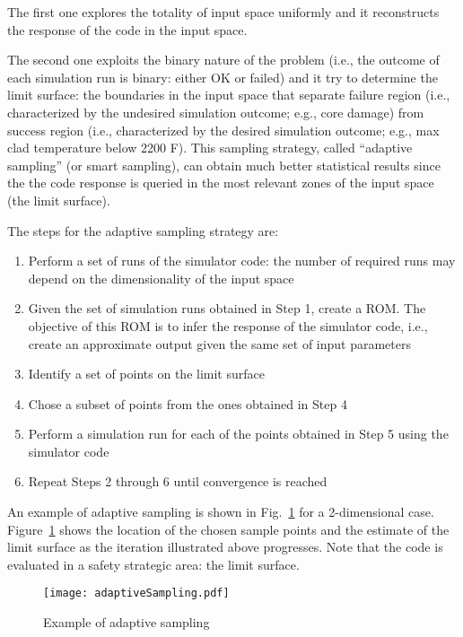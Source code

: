 The first one explores the totality of input space uniformly and it reconstructs the response of the code in 
the input space. 

The second one exploits the binary nature of the problem (i.e., the outcome of each simulation run is binary:
either OK or failed) and it try to determine the limit surface: the boundaries in the input space that separate 
failure region (i.e.,
characterized by the undesired simulation outcome; e.g., core damage) from success region (i.e., characterized 
by the desired simulation outcome; e.g., max clad temperature below 2200 F). 
This sampling strategy, called ``adaptive sampling'' (or smart sampling), can obtain much better statistical results
since the the code response is queried in the most relevant zones of the input space (the limit surface).

The steps for the adaptive sampling strategy are:
\begin{enumerate}
  \item Perform a set of runs of the simulator code: the number of required runs may depend on the dimensionality of 
        the input space
  \item Given the set of simulation runs obtained in Step 1, create a ROM. The objective of this ROM is to infer the 
        response of the simulator code, i.e., create an approximate output given the same set of input parameters
  \item Identify a set of points on the limit surface
  \item Chose a subset of points from the ones obtained in Step 4 
  \item Perform a simulation run for each of the points obtained in Step 5 using the simulator code
  \item Repeat Steps 2 through 6 until convergence is reached
\end{enumerate}

An example of adaptive sampling is shown in Fig.~\ref{fig:adaptiveSampling} for a 2-dimensional case. 
Figure~\ref{fig:adaptiveSampling} shows
the location of the chosen sample points and the estimate of the limit surface as the iteration illustrated above 
progresses. Note that the code is evaluated in a safety strategic area: the limit surface. 

\begin{figure}
    \centering
    \centerline{\texttt{[image: adaptiveSampling.pdf]}}
    \caption{Example of adaptive sampling}
    \label{fig:adaptiveSampling}
\end{figure}

   

 


